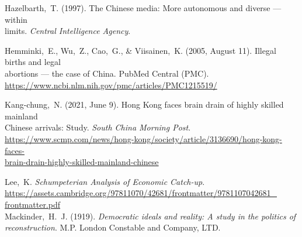 \documentclass[12pt]{article}
\begin{document}
\begin{flushleft}
  Hazelbarth, T. (1997). The Chinese media: More autonomous and diverse — within\\\hspace{.5 in} limits. \textit{Central Intelligence Agency}.\\
  \vspace{5pt}

  Hemminki, E., Wu, Z., Cao, G., & Viisainen, K. (2005, August 11). Illegal births and legal\\\hspace{.5 in} abortions — the case of China. PubMed Central (PMC). \\\hspace{.5 in}\href{https://www.ncbi.nlm.nih.gov/pmc/articles/PMC1215519/}{https://www.ncbi.nlm.nih.gov/pmc/articles/PMC1215519/}\\
  \vspace{5pt}

  Kang-chung, N. (2021, June 9). Hong Kong faces brain drain of highly skilled mainland\\\hspace{.5 in} Chinese arrivals: Study. \textit{South China Morning Post}.\\ \hspace{.5 in}\href{https://www.scmp.com/news/hong-kong/society/article/3136690/hong-kong-faces-brain-drain-highly-skilled-mainland-chinese}{https://www.scmp.com/news/hong-kong/society/article/3136690/hong-kong-faces-\\\hspace{.5 in}brain-drain-highly-skilled-mainland-chinese}\\
  \vspace{5pt}

  \newpage

  Lee, K. \textit{Schumpeterian Analysis of Economic Catch-up}.  \\\hspace{.5 in}\href{https://assets.cambridge.org/97811070/42681/frontmatter/9781107042681\_frontmatter.pdf}{https://assets.cambridge.org/97811070/42681/frontmatter/9781107042681\_\\\hspace{.5 in}frontmatter.pdf}\\

  Mackinder, H. J. (1919). \textit{Democratic ideals and reality: A study in the politics of\\\hspace{.5 in} reconstruction}. M.P. London Constable and Company, LTD.\\
  \vspace{5pt}


\end{flushleft}
\end{document}
